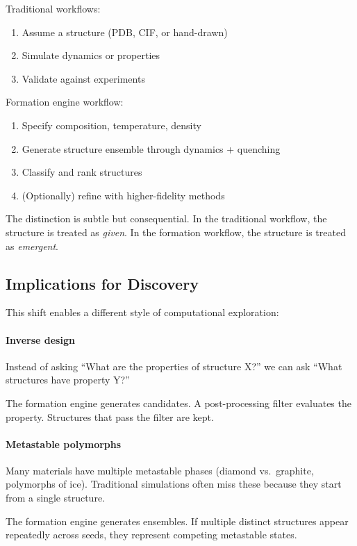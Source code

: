 \documentclass[11pt]{article}
\begin{document}
Traditional workflows:
\begin{enumerate}
\item Assume a structure (PDB, CIF, or hand-drawn)
\item Simulate dynamics or properties
\item Validate against experiments
\end{enumerate}

Formation engine workflow:
\begin{enumerate}
\item Specify composition, temperature, density
\item Generate structure ensemble through dynamics + quenching
\item Classify and rank structures
\item (Optionally) refine with higher-fidelity methods
\end{enumerate}

The distinction is subtle but consequential. In the traditional workflow, the structure is treated as \textit{given}. In the formation workflow, the structure is treated as \textit{emergent}.

\subsection{Implications for Discovery}

This shift enables a different style of computational exploration:

\paragraph{Inverse design} Instead of asking ``What are the properties of structure X?'' we can ask ``What structures have property Y?''

The formation engine generates candidates. A post-processing filter evaluates the property. Structures that pass the filter are kept.

\paragraph{Metastable polymorphs} Many materials have multiple metastable phases (diamond vs.\ graphite, polymorphs of ice). Traditional simulations often miss these because they start from a single structure.

The formation engine generates ensembles. If multiple distinct structures appear repeatedly across seeds, they represent competing metastable states.
\end{document}
